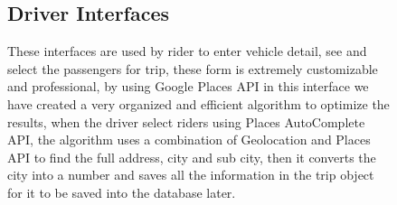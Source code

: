 \begin{figure}
\hspace*{\fill}
\hfill 
{}
\hspace*{\fill}
\end{figure}

\begin{figure}
\subsection{Driver Interfaces}
These interfaces are used by rider to enter vehicle detail, see and select the passengers for trip, these form is extremely customizable and professional, by using Google Places API in this interface we have created a very organized and efficient algorithm to optimize the results, when the driver select riders using Places AutoComplete API, the algorithm uses a combination of Geolocation and Places API to find the full address, city and sub city, then it converts the city into a number and saves all the information in the trip object for it to be saved into the database later.
\hspace*{\fill}
\hfill 
{}
\hspace*{\fill}\\
\hspace*{\fill}
\hfill 
{}
\hspace*{\fill}
\end{figure}

\begin{figure}
\hspace*{\fill}
\hfill 
{}
\hspace*{\fill}
\end{figure}

\begin{figure}
\centering
{}
\end{figure}